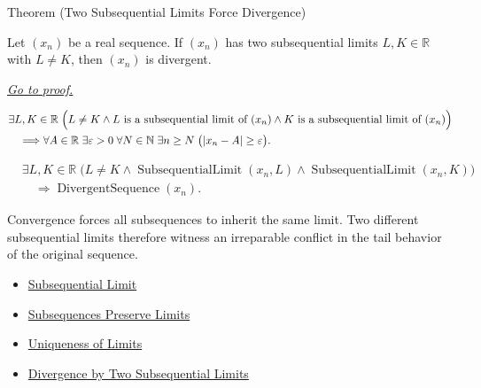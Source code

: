 
\begin{theorembox}{Theorem (Two Subsequential Limits Force Divergence)}
\begin{theorem}
\label{thm:two-subsequential-limits-force-divergence}
Let $(x_n)$ be a real sequence. If $(x_n)$ has two subsequential limits
$L,K\in\mathbb{R}$ with $L\ne K$, then $(x_n)$ is divergent.

\smallskip
\noindent
\hyperref[prf:two-subsequential-limits-force-divergence]{\textit{Go to proof.}}
\end{theorem}
\end{theorembox}

\begin{remark*}
\[
\begin{aligned}
&\exists L,K\in\mathbb{R}\;
\Bigl(
  L\ne K
  \land
  L\text{ is a subsequential limit of }(x_n)
  \land
  K\text{ is a subsequential limit of }(x_n)
\Bigr)\\
&\quad\Longrightarrow
\forall A\in\mathbb{R}\;\exists \varepsilon>0\;\forall N\in\mathbb{N}
\;\exists n\ge N\;\bigl(|x_n-A|\ge\varepsilon\bigr).
\end{aligned}
\]
\end{remark*}

\begin{remark*}
\[
\begin{aligned}
&\exists L,K\in\mathbb{R}\;
\bigl(
  L\ne K
  \land \operatorname{SubsequentialLimit}(x_n,L)
  \land \operatorname{SubsequentialLimit}(x_n,K)
\bigr)\\
&\quad\Longrightarrow
\operatorname{DivergentSequence}(x_n).
\end{aligned}
\]
\end{remark*}

\begin{remark*}[Interpretation]
Convergence forces all subsequences to inherit the same limit. Two different
subsequential limits therefore witness an irreparable conflict in the tail
behavior of the original sequence.
\end{remark*}

\begin{dependencies}
\begin{itemize}
  \item \hyperref[def:subsequential-limit]{Subsequential Limit}
  \item \hyperref[thm:subsequences-preserve-limits]{Subsequences Preserve Limits}
  \item \hyperref[thm:uniqueness-of-limits]{Uniqueness of Limits}
  \item \hyperref[thm:divergence-by-two-subsequential-limits]{Divergence by Two Subsequential Limits}
\end{itemize}
\end{dependencies}

